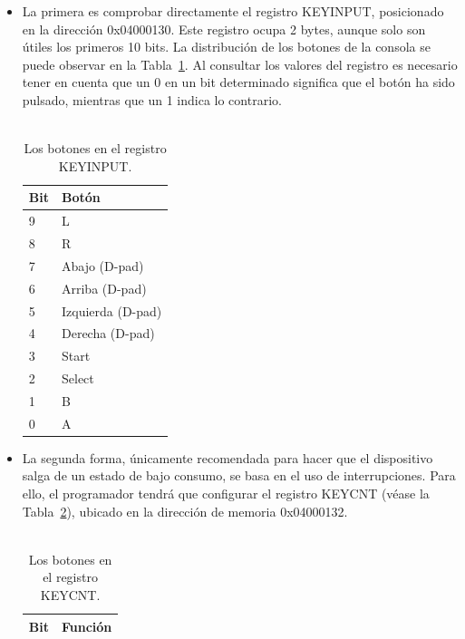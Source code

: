\begin{itemize}
	\item La primera es comprobar directamente el registro KEYINPUT, posicionado en la dirección 0x04000130. Este registro ocupa 2 bytes, aunque solo son útiles los primeros 10 bits. La distribución de los botones de la consola se puede observar en la Tabla~\ref{tab:keypad_reg}. Al consultar los valores del registro es necesario tener en cuenta que un 0 en un bit determinado significa que el botón ha sido pulsado, mientras que un 1 indica lo contrario. \\ \\
	
	\begin{table}[h]
		\centering
		\begin{tabular}{| l | l |}
			\hline
			\textbf{Bit} & \textbf{Botón} \\ \hline
			9 &  L \\ \hline
			8 &  R \\ \hline
			7 &  Abajo (D-pad) \\ \hline
			6 &  Arriba (D-pad) \\ \hline
			5 &  Izquierda (D-pad) \\ \hline
			4 &  Derecha (D-pad) \\ \hline
			3 &  Start \\ \hline
			2 &  Select \\ \hline
			1 &  B \\ \hline
			0 &  A \\ \hline
		\end{tabular}
		\caption{Los botones en el registro KEYINPUT.}\label{tab:keypad_reg}
	\end{table}
	
\item La segunda forma, únicamente recomendada para hacer que el dispositivo salga de un estado de bajo consumo, se basa en el uso de interrupciones. Para ello, el programador tendrá que configurar el registro KEYCNT (véase la Tabla~\ref{tab:keypad_irq_reg}), ubicado en la dirección de memoria 0x04000132. \\ \\

\begin{center}
\begin{longtable}{|p{2cm}|p{9cm}|}
\caption{Los botones en el registro KEYCNT.}\label{tab:keypad_irq_reg} \\

\hline \multicolumn{1}{|p{2cm}|}{\textbf{Bit}} & \multicolumn{1}{p{9cm}|}{\textbf{Función}} \\ \hline 
\endfirsthead


\end{longtable}
\end{center}
\end{itemize}
